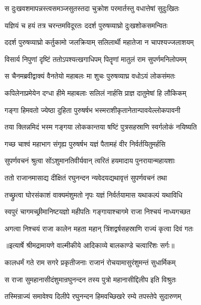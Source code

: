 \twolineshloka
{स दुःखवशमापन्नस्त्वसमञ्जसुतस्तदा}
{चुक्रोश परमार्तस्तु वधात्तेषां सुदुःखितः} %

\twolineshloka
{यज्ञियं च हयं तत्र चरन्तमविदूरतः}
{ददर्श पुरुषव्याघ्रो दुःखशोकसमन्वितः} %

\twolineshloka
{ददर्श पुरुषव्याघ्रो कर्तुकामो जलक्रियाम्}
{सलिलार्थी महातेजा न चापश्यज्जलाशयम्} %

\twolineshloka
{विसार्य निपुणां दृष्टिं ततोऽपश्यत्खगाधिपम्}
{पितॄणां मातुलं राम सुपर्णमनिलोपमम्} %

\twolineshloka
{स चैनमब्रवीद्वाक्यं वैनतेयो महाबलः}
{मा शुचः पुरुषव्याघ्र वधोऽयं लोकसंमतः} %

\twolineshloka
{कपिलेनाप्रमेयेन दग्धा हीमे महाबलाः}
{सलिलं नार्हसि प्राज्ञ दातुमेषां हि लौकिकम्} %

\twolineshloka
{गङ्गा हिमवतो ज्येष्ठा दुहिता पुरुषर्षभ}
{भस्मराशीकृतानेतान्पावयेल्लोकपावनी} %

\twolineshloka
{तया क्लिन्नमिदं भस्म गङ्गया लोककान्तया}
{षष्टिं पुत्रसहस्राणि स्वर्गलोकं नयिष्यति} %

\twolineshloka
{गच्छ चाश्वं महाभाग संगृह्य पुरुषर्षभ}
{यज्ञं पैतामहं वीर निर्वर्तयितुमर्हसि} %

\twolineshloka
{सुपर्णवचनं श्रुत्वा सोंऽशुमानतिवीर्यवान्}
{त्वरितं हयमादाय पुनरायान्महायशाः} %

\twolineshloka
{ततो राजानमासाद्य दीक्षितं रघुनन्दन}
{न्यवेदयद्यथावृत्तं सुपर्णवचनं तथा} %

\twolineshloka
{तच्छ्रुत्वा घोरसंकाशं वाक्यमंशुमतो नृपः}
{यज्ञं निर्वर्तयामास यथाकल्पं यथाविधि} %

\twolineshloka
{स्वपुरं चागमच्छ्रीमानिष्टयज्ञो महीपतिः}
{गङ्गायाश्चागमे राजा निश्चयं नाध्यगच्छत} %

\twolineshloka
{अगत्वा निश्चयं राजा कालेन महता महान्}
{त्रिंशद्वर्षसहस्राणि राज्यं कृत्वा दिवं गतः} %


{॥इत्यार्षे श्रीमद्रामायणे वाल्मीकीये आदिकाव्ये बालकाण्डे चत्वारिंशः सर्गः॥}


\twolineshloka
{कालधर्मं गते राम सगरे प्रकृतीजनाः}
{राजानं रोचयामासुरंशुमन्तं सुधार्मिकम्} %

\twolineshloka
{स राजा सुमहानासीदंशुमान्रघुनन्दन}
{तस्य पुत्रो महानासीद्दिलीप इति विश्रुतः} %

\twolineshloka
{तस्मिन्राज्यं समावेश्य दिलीपे रघुनन्दन}
{हिमवच्छिखरे रम्ये तपस्तेपे सुदारुणम्} %

